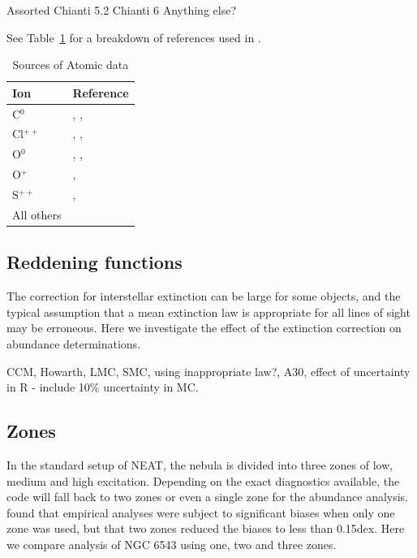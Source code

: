 \documentclass[useAMS,usenatbib]{mn2e}
\begin{document}
Assorted
Chianti 5.2
Chianti 6
Anything else?

See Table~\ref{AD_reftable} for a breakdown of references used in \citet{2011arXiv1108.3800S}.

\begin{table}
        \centering
        \caption{Sources of Atomic data}
        \begin{tabular}{p{0.8cm}|p{6.5cm}}
        Ion &  Reference\\
        \hline
        C$^0$      &    \citet{1976AA....50..141P}, \citet{1987JPhB...20.2553J}, \citet{1979AA....72..129N} \\ 
        Cl$^{++}$  &    \citet{1982MNRAS.198..127M}, \citet{1989AA...208..337B},  \\
        O$^0$      &    \citet{1981PSS...29..377B}, \citet{1988JPhB...21.1083B}, \citet{1988JPhB...21.1455B} \\
        O$^{+}$   &    \citet{1976MNRAS.177...31P}, \citet{1982MNRAS.198..111Z}\\
        S$^{++}$   &    \citet{1982MNRAS.199.1025M}, \citet{1983IAUS..103..143M}        \\
        All others &    \citet{2006ApJS..162..261L} \\
        \end{tabular}
 \label{AD_reftable}    
\end{table}

\subsection{Reddening functions}

The correction for interstellar extinction can be large for some objects, and the typical assumption that a mean extinction law is appropriate for all lines of sight may be erroneous.  Here we investigate the effect of the extinction correction on abundance determinations.

CCM, Howarth, LMC, SMC, using inappropriate law?, A30, effect of uncertainty in R - include 10\% uncertainty in MC.

\subsection{Zones}

In the standard setup of NEAT, the nebula is divided into three zones of low, medium and high excitation.  Depending on the exact diagnostics available, the code will fall back to two zones or even a single zone for the abundance analysis. \citet{2010MNRAS.401.1375E} found that empirical analyses were subject to significant biases when only one zone was used, but that two zones reduced the biases to less than 0.15dex.  Here we compare analysis of NGC 6543 using one, two and three zones.
\end{document}
